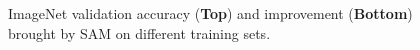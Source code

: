 \documentclass{article}
\begin{document}
\begin{figure}
\vspace{-25pt}
\centering
{}
\vspace{-10pt}
\vspace{-5pt}
\caption{
ImageNet validation accuracy (\textbf{Top}) and improvement (\textbf{Bottom}) brought by SAM on different  training sets.%
}
\label{fig:improve}
\vspace{-30pt}
\end{figure}
\end{document}
